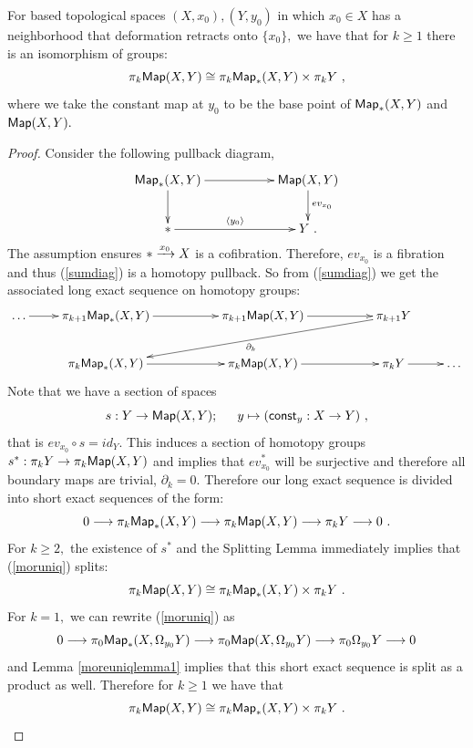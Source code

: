 \begin{lemma} \label{moreuniqlemma2}
For based topological spaces $(X, x_{0}), (Y, y_{0})$ in which $x_{0} \in X$ has a neighborhood that deformation retracts onto $\{x_{0}\},$ we have that for $k \geq 1$ there is an isomorphism of groups: 
\[
\pi_{k}{\sf Map}(X, Y) \cong \pi_{k}{\sf Map}_{\ast}(X, Y) \times \pi_{k}Y~,
\]
where we take the constant map at $y_{0}$ to be the base point of ${\sf Map}_{\ast}(X, Y)$ and ${\sf Map}(X, Y).$
\end{lemma}
\begin{proof}
Consider the following pullback diagram, 
\begin{equation} \label{sumdiag}
\xymatrix{
{\sf Map}_{\ast}(X, Y) \ar[rr]^-{} \ar[d]^-{}
&&
{\sf Map}(X, Y) \ar[d]^-{ev_{x_{0}}}
\\
\ast \ar[rr]^-{\langle y_{0} \rangle} 
&&
Y ~.
}
\end{equation}
The assumption ensures $\ast \xrightarrow{x_{0}} X$ is a cofibration. Therefore, $ev_{x_{0}}$ is a fibration and thus (\ref{sumdiag}) is a homotopy pullback.
So from (\ref{sumdiag}) we get the associated long exact sequence on homotopy groups:
\[
\xymatrix{
\hdots \ar[r]^-{}
&
\pi_{k + 1}{\sf Map}_{\ast}(X, Y) \ar[rr]^-{} 
&&
\pi_{k + 1}{\sf Map}(X, Y) \ar[rr]^-{}
&&
\pi_{k + 1}Y \ar[dllll]^{\partial_{k}}
&
\\
&
\pi_{k}{\sf Map}_{\ast}(X, Y) \ar[rr]^-{} 
&&
\pi_{k}{\sf Map}(X, Y) \ar[rr]^-{}
&&
\pi_{k}Y \ar[r]^-{}
&
\hdots 
}
\]
Note that we have a section of spaces
\[
s:Y \rightarrow {\sf Map}(X, Y); \hspace{15 pt} y \mapsto ( {\sf const}_{y}: X \rightarrow Y)~,
\] that is $ev_{x_{0}} \circ s = id_{Y}.$ This induces a section of homotopy groups $s^{\ast}: \pi_{k}Y \rightarrow \pi_{k}{\sf Map}(X, Y)$ and implies that $ev_{x_{0}}^{\ast}$ will be surjective and therefore all boundary maps are trivial, $\partial_{k} = 0.$ 
Therefore our long exact sequence is divided into short exact sequences of the form:
\begin{equation} \label{moruniq}
0 \longrightarrow \pi_{k}{\sf Map}_{\ast}(X, Y) \longrightarrow \pi_{k}{\sf Map}(X, Y) \longrightarrow \pi_{k}Y \longrightarrow 0~.
\end{equation} 
For $k \geq 2,$ the existence of $s^{\ast}$ and the Splitting Lemma immediately implies that (\ref{moruniq}) splits:
\[
\pi_{k}{\sf Map}(X, Y) \cong \pi_{k}{\sf Map}_{\ast}(X, Y) \times \pi_{k}Y ~.
\]
For $k = 1,$ we can rewrite (\ref{moruniq}) as 
\[
0 \longrightarrow \pi_{0}{\sf Map}_{\ast}(X, \Omega_{y_{0}}Y) \longrightarrow \pi_{0}{\sf Map}(X, \Omega_{y_{0}}Y) \longrightarrow \pi_{0}\Omega_{y_{0}}Y \longrightarrow 0
\]
and Lemma \ref{moreuniqlemma1} implies that this short exact sequence is split as a product as well. Therefore for $k \geq 1$ we have that 
\[
\pi_{k}{\sf Map}(X, Y) \cong \pi_{k}{\sf Map}_{\ast}(X, Y) \times \pi_{k}Y~.
\]
\end{proof}


